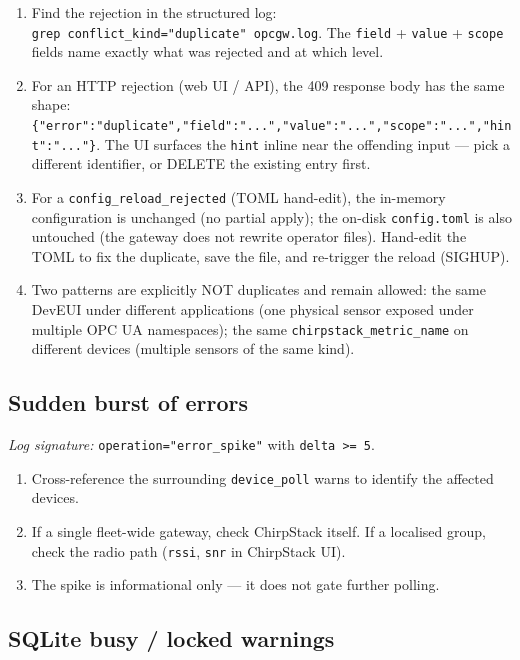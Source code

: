 \begin{enumerate}
\def\labelenumi{\arabic{enumi}.}
\item
  Find the rejection in the structured log: \texttt{grep\ \textquotesingle{}conflict\_kind="duplicate"\textquotesingle{}\ opcgw.log}. The \texttt{field} + \texttt{value} + \texttt{scope} fields name exactly what was rejected and at which level.
\item
  For an HTTP rejection (web UI / API), the 409 response body has the same shape: \texttt{\{"error":"duplicate","field":"...","value":"...","scope":"...","hint":"..."\}}. The UI surfaces the \texttt{hint} inline near the offending input --- pick a different identifier, or DELETE the existing entry first.
\item
  For a \texttt{config\_reload\_rejected} (TOML hand-edit), the in-memory configuration is unchanged (no partial apply); the on-disk \texttt{config.toml} is also untouched (the gateway does not rewrite operator files). Hand-edit the TOML to fix the duplicate, save the file, and re-trigger the reload (SIGHUP).
\item
  Two patterns are explicitly NOT duplicates and remain allowed: the same DevEUI under different applications (one physical sensor exposed under multiple OPC UA namespaces); the same \texttt{chirpstack\_metric\_name} on different devices (multiple sensors of the same kind).
\end{enumerate}

\subsection{Sudden burst of errors}\label{sec-issue-error-spike}

\emph{Log signature:} \texttt{operation="error\_spike"} with \texttt{delta\ \textgreater{}=\ 5}.

\begin{enumerate}
\def\labelenumi{\arabic{enumi}.}
\item
  Cross-reference the surrounding \texttt{device\_poll} warns to identify the affected devices.
\item
  If a single fleet-wide gateway, check ChirpStack itself. If a localised group, check the radio path (\texttt{rssi}, \texttt{snr} in ChirpStack UI).
\item
  The spike is informational only --- it does not gate further polling.
\end{enumerate}

\subsection{SQLite busy / locked warnings}\label{sec-issue-sqlite-busy}

